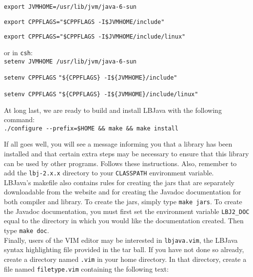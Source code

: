 \vspace{-.25cm}
{\tt export JVMHOME=/usr/lib/jvm/java-6-sun}

{\tt export CPPFLAGS="\$CPPFLAGS -I\$JVMHOME/include"}

{\tt export CPPFLAGS="\$CPPFLAGS -I\$JVMHOME/include/linux"} \\
\vspace{-.25cm}

\noindent
or in {\tt csh}: \\

\vspace{-.25cm}
{\tt setenv JVMHOME /usr/lib/jvm/java-6-sun}

{\tt setenv CPPFLAGS} \verb|"${CPPFLAGS} -I${JVMHOME}/include"|

{\tt setenv CPPFLAGS} \verb|"${CPPFLAGS} -I${JVMHOME}/include/linux"| \\
\vspace{-.25cm}

\noindent
At long last, we are ready to build and install LBJava with the following
command: \\

\vspace{-.25cm}
\verb|./configure --prefix=$HOME && make && make install| \\
\vspace{-.25cm}

\noindent
If all goes well, you will see a message informing you that a library has been
installed and that certain extra steps may be necessary to ensure that this
library can be used by other programs.  Follows these instructions.  Also,
remember to add the {\tt lbj-2.x.x} directory to your {\tt CLASSPATH}
environment variable. \\

LBJava's makefile also contains rules for creating the jars that are separately
downloadable from the website and for creating the Javadoc documentation for
both compiler and library.  To create the jars, simply type {\tt make jars}.
To create the Javadoc documentation, you must first set the environment
variable {\tt LBJ2\_DOC} equal to the directory in which you would like the
documentation created.  Then type {\tt make doc}. \\

Finally, users of the VIM editor may be interested in {\tt lbjava.vim}, the LBJava
syntax highlighting file provided in the tar ball.  If you have not done so
already, create a directory named {\tt .vim} in your home directory.  In that
directory, create a file named {\tt filetype.vim} containing the following
text: \\


